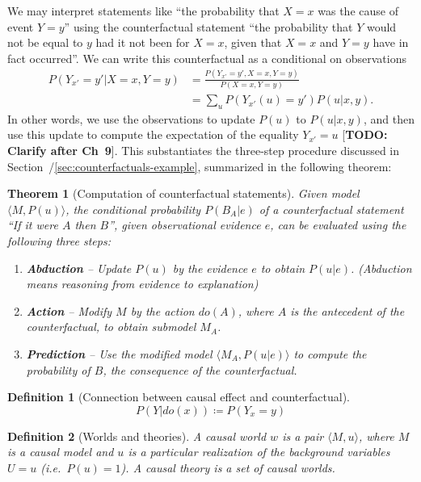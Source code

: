 \documentclass[11pt]{article}
\numberwithin{equation}{section}
\newcommand{\defeq}{\coloneqq}
\newtheorem{thm}{Theorem}[section]
\newtheorem{defn}{Definition}[section]
\begin{document}
We may interpret statements like ``the probability that $X=x$ was the cause of event $Y=y$'' using the counterfactual statement ``the probability that $Y$ would not be equal to $y$ had it not been for $X=x$, given that $X=x$ and $Y=y$ have in fact occurred''. We can write this counterfactual as a conditional on observations
\begin{align}
P(Y_{x'}=y'| X=x, Y=y) &= \frac{P(Y_{x'}=y', X=x, Y=y)}{P(X=x, Y=y)} \\
&= \sum_u P(Y_{x'}(u) = y')P(u|x, y).
\end{align}
In other words, we use the observations to update $P(u)$ to $P(u|x,y)$, and then use this update to compute the expectation of the equality $Y_{x'}=u$ [\textbf{TODO: Clarify after Ch~9}]. This substantiates the three-step procedure discussed in Section~/\ref{sec:counterfactuals-example}, summarized in the following theorem:
\begin{thm}[Computation of counterfactual statements] \label{thm:comp-counterfactuals}
Given model $\langle M, P(u)\rangle$, the conditional probability $P(B_A|e)$ of a counterfactual statement ``If it were $A$ then $B$'', given observational evidence $e$, can be evaluated using the following three steps:
\begin{enumerate}[noitemsep]
\item \textbf{Abduction} -- Update $P(u)$ by the evidence $e$ to obtain $P(u|e)$. (Abduction means reasoning from evidence to explanation)
\item \textbf{Action} -- Modify $M$ by the action $do(A)$, where $A$ is the antecedent of the counterfactual, to obtain submodel $M_A$.
\item \textbf{Prediction} -- Use the modified model $\langle M_A, P(u|e)\rangle$ to compute the probability of $B$, the consequence of the counterfactual.
\end{enumerate}
\end{thm}

\begin{defn}[Connection between causal effect and counterfactual]
\begin{equation}
P(Y|do(x)) \defeq P(Y_{x}=y)
\end{equation}
\end{defn}

\begin{defn}[Worlds and theories]
A causal world $w$ is a pair $\langle M,u \rangle$, where $M$ is a causal model and $u$ is a particular realization of the background variables $U=u$ (i.e.\ $P(u)=1$). A causal theory is a set of causal worlds.
\end{defn}
\end{document}
